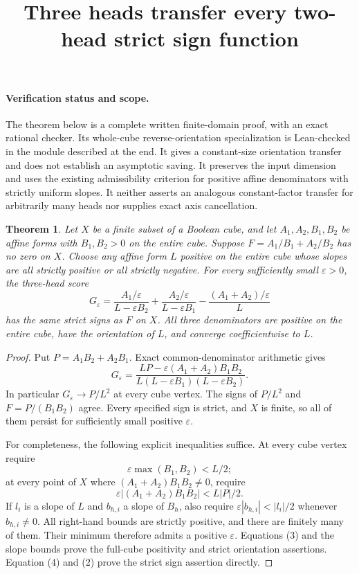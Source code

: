 \documentclass{article}
\newtheorem{theorem}{Theorem}
\begin{document}
\title{Three heads transfer every two-head strict sign function}
\author{}\date{}\maketitle

\paragraph{Verification status and scope.}
The theorem below is a complete written finite-domain proof, with an
exact rational checker. Its whole-cube reverse-orientation specialization
is Lean-checked in the module described at the end. It gives a constant-size
orientation transfer and does not establish an asymptotic saving.
It preserves the input dimension and uses the existing admissibility
criterion for positive affine denominators with strictly uniform slopes.
It neither asserts an analogous constant-factor transfer for arbitrarily
many heads nor supplies exact axis cancellation.

\begin{theorem}
Let $X$ be a finite subset of a Boolean cube, and let $A_1,A_2,B_1,B_2$
be affine forms with $B_1,B_2>0$ on the entire cube. Suppose
$F=A_1/B_1+A_2/B_2$ has no zero on $X$.
Choose any affine form $L$ positive on the entire cube whose slopes
are all strictly positive or all strictly negative.
For every sufficiently small $\varepsilon>0$, the three-head score
\[
 G_\varepsilon=
 \frac{A_1/\varepsilon}{L-\varepsilon B_2}
 +\frac{A_2/\varepsilon}{L-\varepsilon B_1}
 -\frac{(A_1+A_2)/\varepsilon}{L}
 \tag{1}
\]
has the same strict signs as $F$ on $X$. All three denominators are
positive on the entire cube, have the orientation of $L$, and converge
coefficientwise to $L$.
\end{theorem}
\begin{proof}
Put $P=A_1B_2+A_2B_1$. Exact common-denominator arithmetic gives
\[
 G_\varepsilon=
 \frac{LP-\varepsilon(A_1+A_2)B_1B_2}
 {L(L-\varepsilon B_1)(L-\varepsilon B_2)}.
 \tag{2}
\]
In particular $G_\varepsilon\to P/L^2$ at every cube vertex.
The signs of $P/L^2$ and $F=P/(B_1B_2)$ agree. Every specified sign
is strict, and $X$ is finite, so all of them persist for sufficiently
small positive $\varepsilon$.

For completeness, the following explicit inequalities suffice.
At every cube vertex require
\[
 \varepsilon\max(B_1,B_2)<L/2;
 \tag{3}
\]
at every point of $X$ where $(A_1+A_2)B_1B_2\ne0$, require
\[
 \varepsilon |(A_1+A_2)B_1B_2|<L|P|/2.
 \tag{4}
\]
If $l_i$ is a slope of $L$ and $b_{h,i}$ a slope of $B_h$, also
require $\varepsilon|b_{h,i}|<|l_i|/2$ whenever $b_{h,i}\ne0$.
All right-hand bounds are strictly positive, and there are finitely
many of them. Their minimum therefore admits a positive
$\varepsilon$. Equations (3) and the slope bounds prove the full-cube
positivity and strict orientation assertions. Equation (4) and (2)
prove the strict sign assertion directly.
\end{proof}
\end{document}
